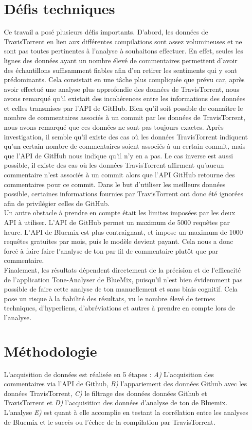 \documentclass[10pt, conference]{IEEEtran}
\begin{document}
\section{Défis techniques}
\label{sec:Defis}
Ce travail a posé plusieurs défis importants. D'abord, les données de TravisTorrent en lien aux différentes compilations sont assez volumineuses et ne sont pas toutes pertinentes à l'analyse à souhaitons effectuer. En effet, seules les lignes des données ayant un nombre élevé de commentaires permettent d'avoir des échantillons suffisamment fiables afin d'en retirer les sentiments qui y sont prédominants. Cela consistait en une tâche plus compliquée que prévu car, après avoir effectué une analyse plus approfondie des données de TravisTorrent, nous avons remarqué qu'il existait des incohérences entre les informations des données et celles transmises par l'API de GitHub. Bien qu'il soit possible de connaître le nombre de commentaires associés à un commit par les données de TravisTorrent, nous avons remarqué que ces données ne sont pas toujours exactes. Après investigation, il semble qu'il existe des cas où les données TravisTorrent indiquent qu'un certain nombre de commentaires soient associés à un certain commit, mais que l'API de GitHub nous indique qu’il n’y en a pas. Le cas inverse est aussi possible, il existe des cas où les données TravisTorrent affirment qu'aucun commentaire n'est associés à un commit alors que l'API GitHub retourne des commentaires pour ce commit. Dans le but d’utiliser les meilleurs données possible, certaines informations fournies par TravisTorrent ont donc été ignorées afin de privilégier celles de GitHub. \\
Un autre obstacle à prendre en compte était les limites imposées par les deux API à utiliser. L'API de GitHub permet un maximum de 5000 requêtes par heure. L'API de Bluemix est plus contraignant, et impose un maximum de 1000 requêtes gratuites par mois, puis le modèle devient payant. Cela nous a donc forcé à faire faire l’analyse de ton par fil de commentaire plutôt que par commentaire. \\
Finalement, les résultats dépendent directement de la précision et de l'efficacité de l'application Tone-Analyser de BlueMix, puisqu'il n'est bien évidemment pas possible de faire cette analyse de ton manuellement et sans biais cognitif. Cela pose un risque à la fiabilité des résultats, vu le nombre élevé de termes techniques, d’hyperliens, d'abréviations et autres à prendre en compte lors de l’analyse. 


\section{Méthodologie}
\label{sec:Methodologie}
L’acquisition de données est réalisée en 5 étapes : \emph{A)} L’acquisition des commentaires via l’API de Github, \emph{B)} l’appariement des données Github avec les données TravisTorrent, \emph{C)} le filtrage des données données Github et TravisTorrent et \emph{D)} l’acquisition des données d’analyse de ton de Bluemix. L’analyse \emph{E)} est quant à elle accomplie en testant la corrélation entre les analyses de Bluemix et le succès ou l’échec de la compilation par TravisTorrent.
\end{document}
